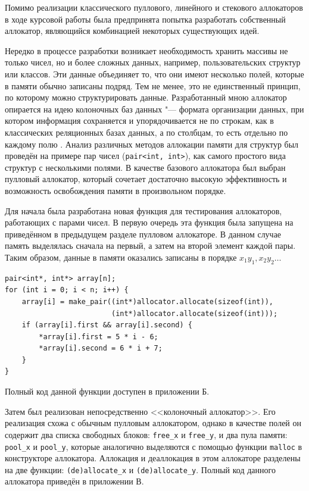 Помимо реализации классического пуллового, линейного и стекового аллокаторов в ходе курсовой работы была предпринята попытка разработать собственный аллокатор, являющийся комбинацией некоторых существующих идей.

Нередко в процессе разработки возникает необходимость хранить массивы не только чисел, но и более сложных данных, например, пользовательских структур или классов. Эти данные объединяет то, что они имеют несколько полей, которые в памяти обычно записаны подряд. Тем не менее, это не единственный принцип, по которому можно структурировать данные. Разработанный мною аллокатор опирается на идею колоночных баз данных "--- формата организации данных, при котором информация сохраняется и упорядочивается не по строкам, как в классических реляционных базах данных, а по столбцам, то есть отдельно по каждому полю \cite{column-databases}. Анализ различных методов аллокации памяти для структур был проведён на примере пар чисел (\texttt{pair<int, int>}), как самого простого вида структур с несколькими полями. В качестве базового аллокатора был выбран пулловый аллокатор, который сочетает достаточно высокую эффективность и возможность освобождения памяти в произвольном порядке.

Для начала была разработана новая функция для тестирования аллокаторов, работающих с парами чисел. В первую очередь эта функция была запущена на приведённом в предыдущем разделе пулловом аллокаторе. В данном случае память выделялась сначала на первый, а затем на второй элемент каждой пары. Таким образом, данные в памяти оказались записаны в порядке $x_1 y_1, x_2 y_2 \ldots$

\small
\begin{verbatim}
pair<int*, int*> array[n];
for (int i = 0; i < n; i++) {
	array[i] = make_pair((int*)allocator.allocate(sizeof(int)),
						 (int*)allocator.allocate(sizeof(int)));
    if (array[i].first && array[i].second) {
		*array[i].first = 5 * i - 6;
		*array[i].second = 6 * i + 7;
	}
}
\end{verbatim}
\normalsize

Полный код данной функции доступен в приложении Б.

Затем был реализован непосредственно <<колоночный аллокатор>>. Его реализация схожа с обычным пулловым аллокатором, однако в качестве полей он содержит два списка свободных блоков: \texttt{free\_x} и \texttt{free\_y}, и два пула памяти: \texttt{pool\_x} и \texttt{pool\_y}, которые аналогично выделяются с помощью функции \texttt{malloc} в конструкторе аллокатора. Аллокация и деаллокация в этом аллокаторе разделены на две функции: \texttt{(de)allocate\_x} и \texttt{(de)allocate\_y}. Полный код данного аллокатора приведён в приложении В.

